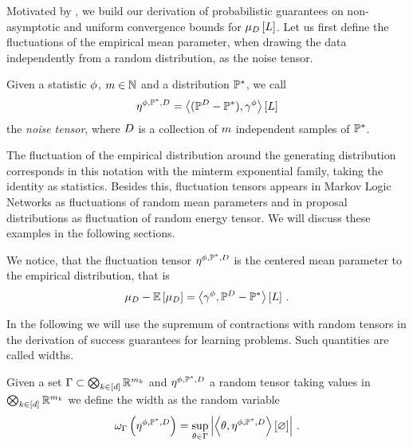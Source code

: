 
Motivated by , we build our derivation of probabilistic guarantees on non-asymptotic and uniform convergence bounds for $\mu_{D}\left[L\right]$.
Let us first define the fluctuations of the empirical mean parameter, when drawing the data independently from a random distribution, as the noise tensor.

\begin{definition}
    \label{def:noiseTensor}
    Given a statistic $\phi$, $m\in\mathbb{N}$ and a distribution $\mathbb{P}^*$, we call
    \begin{align*}
        \eta^{\phi,\mathbb{P}^*,D} = \left\langle (\mathbb{P}^{D}-\mathbb{P}^*),\gamma^{\phi}\right\rangle \left[ L \right]
    \end{align*}
    the \emph{noise tensor}, where $D$ is a collection of $m$ independent samples of $\mathbb{P}^*$.
\end{definition}

The fluctuation of the empirical distribution around the generating distribution corresponds in this notation with the minterm exponential family, taking the identity as statistics.
Besides this, fluctuation tensors appears in Markov Logic Networks as fluctuations of random mean parameters and in proposal distributions as fluctuation of random energy tensor.
We will discuss these examples in the following sections.


We notice, that the fluctuation tensor $\eta^{\phi,\mathbb{P}^*,D}$ is the centered mean parameter to the empirical distribution, that is
\begin{align*}
    \mu_{D} - \mathbb{E}\left[\mu_{D}\right] =  \left\langle \gamma^{\phi},\mathbb{P}^{D}-\mathbb{P}^*\right\rangle \left[ L \right] \, .
\end{align*}

In the following we will use the supremum of contractions with random tensors in the derivation of success guarantees for learning problems.
Such quantities are called widths.

\begin{definition}
    \label{def:width}
    Given a set $\Gamma\subset\bigotimes_{k\in[d]} \mathbb{R}^{m_{k}}$ and $\eta^{\phi,\mathbb{P}^*,D}$ a random tensor taking values in $\bigotimes_{k\in[d]} \mathbb{R}^{m_{k}}$ we define the width as the random variable
    \[ \omega_{\Gamma}\left(\eta^{\phi,\mathbb{P}^*,D}\right) = \sup_{\theta\in\Gamma} \left|\left\langle \theta,\eta^{\phi,\mathbb{P}^*,D}\right\rangle \left[ \varnothing \right]\right| \, . \]
\end{definition}


